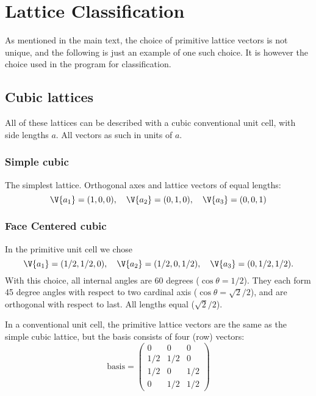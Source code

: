\documentclass[main.tex]{subfiles}
\begin{document}
	\section{Lattice Classification}\label{app:lattice}
	As mentioned in the main text, the choice of primitive lattice vectors is not unique, and the following is just an example of one such choice. It is however the choice used in the program for classification.
	
	
	\subsection*{Cubic lattices}
	All of these lattices can be described with a cubic conventional unit cell, with side lengths $ a $. All vectors as such in units of $ a $.
	
	\subsubsection*{Simple cubic}
	The simplest lattice. Orthogonal axes and lattice vectors of equal lengths:
	\begin{equation*}
		\V{a_1} = (1,0,0), \quad \V{a_2} = (0,1,0), \quad \V{a_3} = (0,0,1)
	\end{equation*}
	
	\subsubsection*{Face Centered cubic}
	In the primitive unit cell we chose
	\begin{equation*}
		\V{a_1} = (1/2, 1/2, 0),\quad \V{a_2} = (1/2, 0, 1/2),\quad \V{a_3} = (0, 1/2, 1/2).
	\end{equation*}
	With this choice, all internal angles are 60 degrees ($\cos \theta = 1/2$). They each form 45 degree angles with respect to two cardinal axis ($\cos \theta = \sqrt{2}/2$), and are orthogonal with respect to last. All lengths equal ($\sqrt{2}/2$).
	
	In a conventional unit cell, the primitive lattice vectors are the same as the simple cubic lattice, but the basis consists of four (row) vectors:
	\begin{equation*}
		\text{basis} = \begin{pmatrix}
			0 & 0 & 0 \\
			1/2 & 1/2 & 0 \\
			1/2 & 0 & 1/2 \\
			0 & 1/2 & 1/2
		\end{pmatrix}
	\end{equation*}
	
\end{document}
